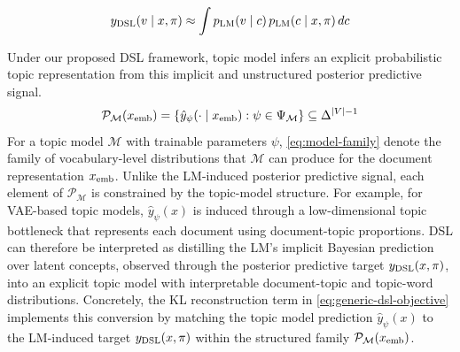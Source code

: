 \documentclass{article}
\theoremstyle{plain}
\theoremstyle{definition}
\theoremstyle{remark}
\begin{document}
\begin{equation}
y_{\rm DSL}(v \mid x, \pi)
\approx
\int
p_{\rm LM}(v \mid c)\,
p_{\rm LM}(c \mid x, \pi)\,
dc
\label{eq:implicit-posterior-predictive}
\end{equation}


Under our proposed DSL framework, topic model infers an explicit probabilistic topic representation from this implicit and unstructured posterior predictive signal.
\begin{equation}
\mathcal{P}_{\mathcal{M}}(x_{\rm emb}) = \left\{
\hat{y}_{\psi}(\cdot \mid x_{\rm emb}): \psi \in \Psi_{\mathcal{M}} \right\} \subseteq \Delta^{|V|-1}
\label{eq:model-family}
\end{equation}
For a topic model $\mathcal{M}$ with trainable parameters $\psi$, \autoref{eq:model-family} denote the family of vocabulary-level distributions that $\mathcal{M}$ can produce for the document representation $x_{\rm emb}$. Unlike  the LM-induced posterior predictive signal, each element of $\mathcal{P}_{\mathcal{M}}$ is constrained by the topic-model structure. For example, for VAE-based topic models, $\hat{y}_{\psi}(x)$ is induced through a low-dimensional topic bottleneck that represents each document using document-topic proportions.
DSL can therefore be interpreted as distilling the LM's implicit Bayesian prediction over latent concepts, observed through the posterior predictive target $y_{\rm DSL}(x, \pi)$, into an explicit topic model with interpretable document-topic and topic-word distributions.
Concretely, the KL reconstruction term in \autoref{eq:generic-dsl-objective} implements this conversion by matching the topic model prediction $\hat{y}_{\psi}(x)$ to the LM-induced target
$y_{\rm DSL}(x, \pi)$ within the structured family $\mathcal{P}_{\mathcal{M}}(x_{\rm emb})$.

\end{document}
